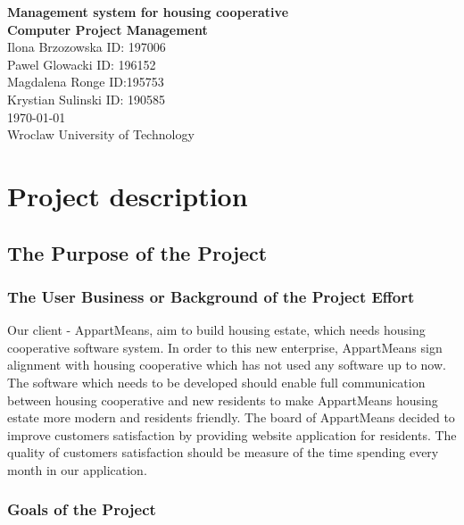 \documentclass[a4paper,10pt]{report}
\newcommand{\hilight}[1]{\colorbox{blue!30!}{#1}}
\begin{document}
\begin{titlepage}
\begin{center}
\textbf{\LARGE Management system for housing cooperative}\\ [2ex]\textbf{Computer Project Management }\\
[45ex]Ilona Brzozowska ID: 197006  \\ Pawel Glowacki ID: 196152 \\
 \hilight{Magdalena Ronge ID:195753} \\ Krystian Sulinski ID: 190585 \\
{\today} \\
[70ex]{Wroclaw University of Technology} \\
\end{center}
\end{titlepage}

\tableofcontents

\chapter{Project description}

\section{The Purpose of the Project}



\subsection{The User Business or Background of the Project Effort}

Our client - AppartMeans, aim to build housing estate, which needs housing cooperative software
system. In order to this new enterprise, AppartMeans sign alignment with housing cooperative
which has not used any software up to now. The software which needs to be developed should
enable full communication between housing cooperative and new residents to make AppartMeans
housing estate more modern and residents friendly. The board of AppartMeans decided to
improve customers satisfaction by providing website application for residents. The quality of
customers satisfaction should be measure of the time spending every month in our application.



\subsection{Goals of the Project}
\end{document}
